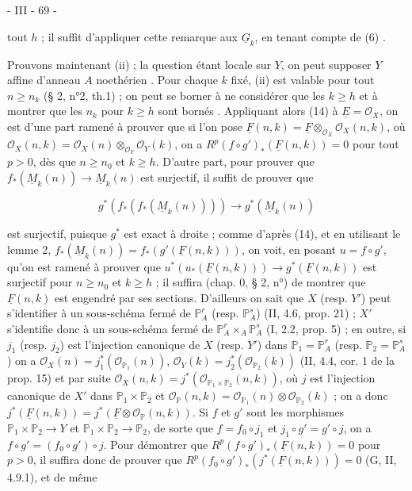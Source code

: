 \newpage


- III - 69 -

tout $h$ ; il suffit d'appliquer cette remarque aux $\underline{G}_k$, en tenant compte de (6) .

Prouvons maintenant (ii) ; la question étant locale sur $Y$, on peut supposer $Y$ affine d'anneau $A$ noethérien . Pour chaque $k$ fixé, (ii) est valable pour tout $n \geqslant n_k$ (§ 2, n°2, th.1) ; on peut se borner à ne considérer que les $k \geqslant h$ et à montrer que les $n_k$ pour $k \geqslant h$ sont bornés . Appliquant alors (14) à $\underline{E}=\mathcal{O}_X$, on est d'une part ramené à prouver que si l'on pose $\underline{F}(n,k)=\underline{F} \otimes_{\mathcal{O}_X} \mathcal{O}_X(n,k)$, où $\mathcal{O}_X(n,k) = \mathcal{O}_X(n) \otimes_{\mathcal{O}_Y} \mathcal{O}_Y(k)$, on a $R^p(f \circ g')_* (\underline{F}(n,k)) = 0$ pour tout $p > 0$, dès que $n \geqslant n_0$ et $k \geqslant h$. D'autre part, pour prouver que $f_*(\underline{M}_k(n)) \to \underline{M}_k(n)$ est surjectif, il suffit de prouver que 

$$ g^* (f_* (f_* (\underline{M}_k(n)))) \to g^* (\underline{M}_k(n)) $$

est surjectif, puisque $g^*$ est exact à droite ; comme d'après (14), et en utilisant le lemme 2, $f_* (\underline{M}_k(n)) = f_* (g' (\underline{F}(n,k)))$, on voit, en posant $u=f \circ g'$, qu'on est ramené à prouver que $u^* (u_* (\underline{F}(n,k))) \to g^* (\underline{F}(n,k))$ est surjectif pour $n \geqslant n_0$ et $k \geqslant h$ ; il suffira (chap. 0, § 2, n°) de montrer que $\underline{F}(n,k)$ est engendré par ses sections. D'ailleurs on sait que $X$ (resp. $Y'$) peut s'identifier à un sous-schéma fermé de $\mathbb{P}_A^r$ (resp. $\mathbb{P}_A^s$) (II, 4.6, prop. 21) ; $X'$ s'identifie donc à un sous-schéma fermé de $\mathbb{P}_A^r \times_A \mathbb{P}_A^s$ (I, 2.2, prop. 5) ; en outre, si $j_1$ (resp. $j_2$) est l'injection canonique de $X$ (resp. $Y'$) dans $\mathbb{P}_1 = \mathbb{P}_A^r$ (resp. $\mathbb{P}_2 = \mathbb{P}_A^s$) on a $\mathcal{O}_X(n) = j_1^* (\mathcal{O}_{\mathbb{P}_1}(n))$, $\mathcal{O}_Y(k) = j_2^* (\mathcal{O}_{\mathbb{P}_2}(k))$ (II, 4.4, cor. 1 de la prop. 15) et par suite $\mathcal{O}_X(n,k) = j^* (\mathcal{O}_{\mathbb{P}_1 \times \mathbb{P}_2}(n,k))$, où $j$ est l'injection canonique de $X'$ dans $\mathbb{P}_1 \times \mathbb{P}_2$ et $\mathcal{O}_{\mathbb{P}}(n,k) = \mathcal{O}_{\mathbb{P}_1}(n) \otimes \mathcal{O}_{\mathbb{P}_2}(k)$ ; on a donc $j^* (\underline{F}(n,k)) = j^* (\underline{F} \otimes \mathcal{O}_{\mathbb{P}}(n,k))$. Si $f$ et $g'$ sont les morphismes $\mathbb{P}_1 \times \mathbb{P}_2 \to Y$ et $\mathbb{P}_1 \times \mathbb{P}_2 \to \mathbb{P}_2$, de sorte que $f=f_0 \circ j_1$ et $j_1 \circ g' = g' \circ j$, on a $f \circ g' = (f_0 \circ g') \circ j$. Pour démontrer que $R^p(f \circ g')_* (\underline{F}(n,k)) = 0$ pour $p > 0$, il suffira donc de prouver que $R^p (f_0 \circ g')_* (j^* (\underline{F}(n,k))) = 0$ (G, II, 4.9.1), et de même

